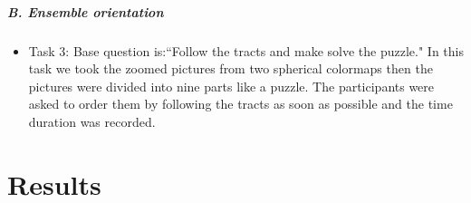 \documentclass[a4paper, 12pt]{report}
\begin{document}
\paragraph{B. Ensemble orientation}

\begin{itemize}
\item{Task 3:} Base question is:``Follow the tracts and make solve the puzzle."
In this task we took the zoomed pictures from two spherical colormaps then the pictures were divided into nine parts like a puzzle. The participants were asked to order them by following the tracts as soon as possible and the time duration was recorded.  

\end{itemize}

\chapter{Results}


\end{document}
